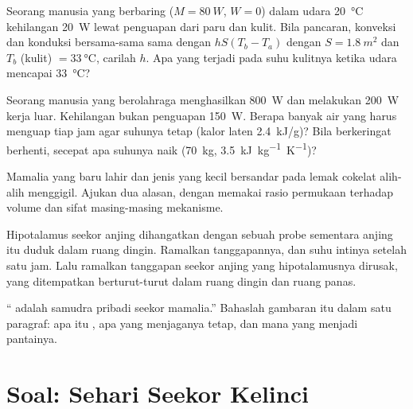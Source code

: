 \begin{exercise}[$\star\star$]\label{exo:b1:mammal-organization:8}
Seorang manusia yang berbaring ($M = \qty{80}{W}$, $W = 0$) dalam udara
\qty{20}{\celsius} kehilangan \qty{20}{W} lewat penguapan dari paru dan
kulit. Bila pancaran, konveksi dan konduksi bersama-sama sama dengan
$hS(T_b - T_a)$ dengan $S = \qty{1.8}{m^2}$ dan $T_b$ (kulit) $=
\qty{33}{\celsius}$, carilah $h$. Apa yang terjadi pada suhu kulitnya
ketika udara mencapai \qty{33}{\celsius}?
\end{exercise}

\begin{exercise}[$\star\star$]\label{exo:b1:mammal-organization:9}
Seorang manusia yang berolahraga menghasilkan \qty{800}{W} dan
melakukan \qty{200}{W} kerja luar. Kehilangan bukan penguapan
\qty{150}{W}. Berapa banyak air yang harus menguap tiap jam agar suhunya
tetap (kalor laten \qty{2.4}{kJ/g})? Bila berkeringat berhenti, secepat
apa suhunya naik (\qty{70}{kg}, \qty{3.5}{kJ.kg^{-1}.K^{-1}})?
\end{exercise}

\begin{exercise}[$\star\star\star$]\label{exo:b1:mammal-organization:10}
Mamalia yang baru lahir dan jenis yang kecil bersandar pada lemak
cokelat alih-alih menggigil. Ajukan dua alasan, dengan memakai rasio
permukaan terhadap volume dan sifat masing-masing mekanisme.
\end{exercise}

\begin{exercise}[$\star\star\star$]\label{exo:b1:mammal-organization:11}
Hipotalamus seekor anjing dihangatkan dengan sebuah probe sementara
anjing itu duduk dalam ruang dingin. Ramalkan tanggapannya, dan suhu
intinya setelah satu jam. Lalu ramalkan tanggapan seekor anjing yang
hipotalamusnya dirusak, yang ditempatkan berturut-turut dalam ruang
dingin dan ruang panas.
\end{exercise}

\begin{exercise}[$\star\star\star$]\label{exo:b1:mammal-organization:12}
`` adalah samudra pribadi seekor mamalia.'' Bahaslah
gambaran itu dalam satu paragraf: apa itu , apa yang
menjaganya tetap, dan  mana yang menjadi pantainya.
\end{exercise}

\section{Soal: Sehari Seekor Kelinci}

